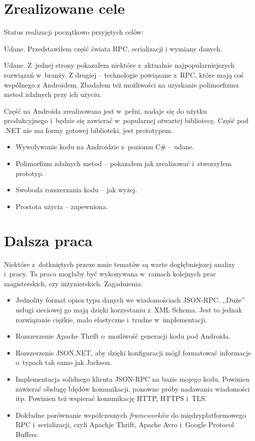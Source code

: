 \section{Zrealizowane cele}
Status realizacji początkowo przyjętych celów:
\begin{description}
Udane. Przedstawiłem część świata RPC, serializacji i wymiany danych.

Udane. Z~jednej strony pokazałem niektóre z~aktualnie najpopularniejszych rozwiązań w~branży. Z drugiej -- technologie powiązane z~RPC, które mają coś wspólnego z Androidem.
Zbadałem też możliwości na uzyskanie polimorfizmu metod zdalnych przy ich użyciu.

Część na Androida zrealizowana jest w~pełni, nadaje się do użytku produkcyjnego i~będzie się zawierać w~popularnej otwartej bibliotecę.
Część pod .NET nie ma formy gotowej biblioteki, jest prototypem.
\begin{itemize}
  \item Wywoływanie kodu na Androidzie z~poziomu C\# -- udane.
	\item Polimorfizm zdalnych metod -- pokazałem jak zrealizować i~stworzyłem prototyp.
	\item Swoboda rozszerzania kodu -- jak wyżej.
	\item Prostota użycia -- zapewniona.
\end{itemize}

\end{description}



\section{Dalsza praca}
Niektóre z~dotkniętych przeze mnie tematów są warte dogłębniejszej analizy i~pracy.
Ta praca mogłaby być wykonywana w~ramach kolejnych prac magisterskich, czy inżynierskich.
Zagadnienia:
\begin{itemize}
	\item Jednolity format opisu typu danych we wiadomościach JSON-RPC. ,,Duże'' usługi sieciowej go mają dzięki korzystaniu z~XML Schema. Jest to jednak rozwiązanie ciężkie, mało elastyczne i~trudne w~implementacji.
	\item Rozszerzenie Apache Thrift o~możliwość generacji kodu pod Androida.
	\item Rozszerzenie JSON.NET, aby dzięki konfiguracji mógł formatować informacje o~typach tak samo jak Jackson.
	\item Implementacja solidnego klienta JSON-RPC na bazie mojego kodu. Powinien zawierać obsługę błędów komunikacji, ponowne próby nadawania wiadomości itp. Powinien też wspierać komunikację HTTP, HTTPS i~TLS.
	\item Dokładne porównanie współczesnych \emph{frameworków} do międzyplatformowego RPC i~serializacji, czyli Apachje Thrift, Apache Avro i~Google Protocol Buffers.
\end{itemize}


